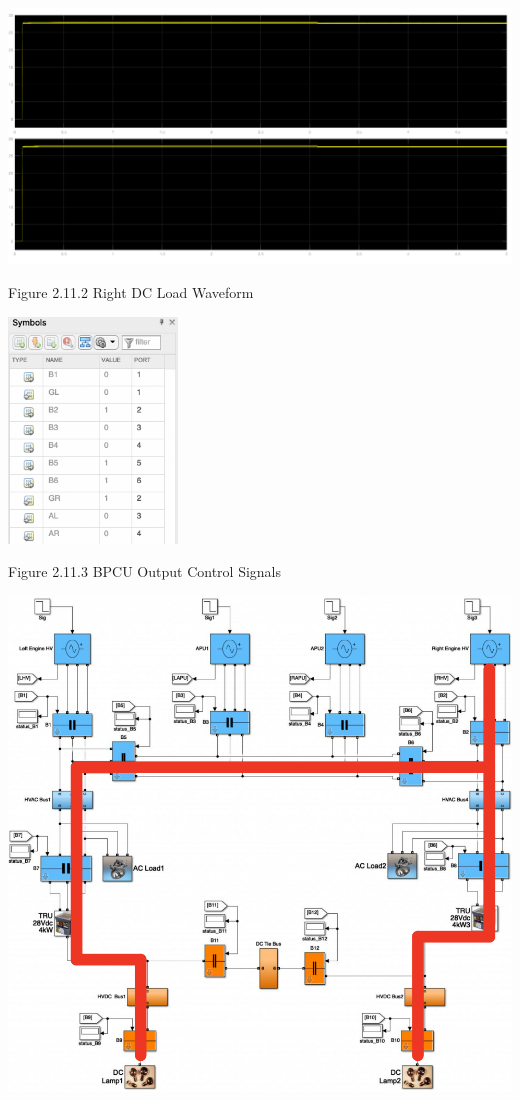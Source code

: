 \documentclass{mcmthesis}
\begin{document}
\includegraphics[trim= 0 0.255\imageheight{} 0 0, clip, width = 0.185\imageheight{}]{gl_ar_al_load2.png}
\begin{center}
\small{Figure 2.11.2 Right DC Load Waveform}
\end{center}
\begin{center}
\includegraphics[width=4.5cm]{gl_ar_al_signals.png}
\end{center}
\begin{center}
\small{Figure 2.11.3 BPCU Output Control Signals}
\end{center}
\begin{center}
\includegraphics[width=14.5cm]{gl_ar_al.png}
\end{center}
\end{document}

